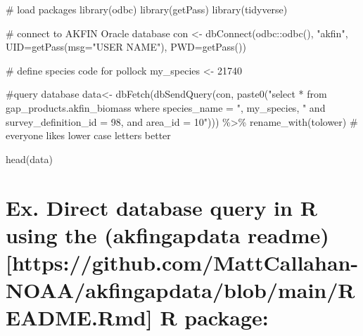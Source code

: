 \documentclass[
  letterpaper,
  oneside,
  open=any]{scrbook}
\newenvironment{Shaded}{\begin{snugshade}}{\end{snugshade}}
\newcommand{\AttributeTok}[1]{\textcolor[rgb]{0.40,0.45,0.13}{#1}}
\newcommand{\CommentTok}[1]{\textcolor[rgb]{0.37,0.37,0.37}{#1}}
\newcommand{\DecValTok}[1]{\textcolor[rgb]{0.68,0.00,0.00}{#1}}
\newcommand{\FunctionTok}[1]{\textcolor[rgb]{0.28,0.35,0.67}{#1}}
\newcommand{\NormalTok}[1]{\textcolor[rgb]{0.00,0.23,0.31}{#1}}
\newcommand{\OtherTok}[1]{\textcolor[rgb]{0.00,0.23,0.31}{#1}}
\newcommand{\SpecialCharTok}[1]{\textcolor[rgb]{0.37,0.37,0.37}{#1}}
\newcommand{\StringTok}[1]{\textcolor[rgb]{0.13,0.47,0.30}{#1}}
\begin{document}
\begin{Shaded}
\begin{Highlighting}[]
\CommentTok{\# load packages}
\FunctionTok{library}\NormalTok{(odbc)}
\FunctionTok{library}\NormalTok{(getPass)}
\FunctionTok{library}\NormalTok{(tidyverse)}

\CommentTok{\# connect to AKFIN Oracle database}
\NormalTok{con }\OtherTok{\textless{}{-}} \FunctionTok{dbConnect}\NormalTok{(odbc}\SpecialCharTok{::}\FunctionTok{odbc}\NormalTok{(), }\StringTok{"akfin"}\NormalTok{, }\AttributeTok{UID=}\FunctionTok{getPass}\NormalTok{(}\AttributeTok{msg=}\StringTok{"USER NAME"}\NormalTok{), }\AttributeTok{PWD=}\FunctionTok{getPass}\NormalTok{())}
\end{Highlighting}
\end{Shaded}

\begin{Shaded}
\begin{Highlighting}[]
\CommentTok{\# define species code for pollock}
\NormalTok{my\_species }\OtherTok{\textless{}{-}} \DecValTok{21740}

\CommentTok{\#query database}
\NormalTok{data}\OtherTok{\textless{}{-}} \FunctionTok{dbFetch}\NormalTok{(}\FunctionTok{dbSendQuery}\NormalTok{(con,}
                           \FunctionTok{paste0}\NormalTok{(}\StringTok{"select * from gap\_products.akfin\_biomass }
\StringTok{where species\_name = "}\NormalTok{, my\_species, }
\StringTok{" and survey\_definition\_id = 98, }
\StringTok{and area\_id = 10"}\NormalTok{))) }\SpecialCharTok{\%\textgreater{}\%}
\FunctionTok{rename\_with}\NormalTok{(tolower) }\CommentTok{\# everyone likes lower case letters better}

\FunctionTok{head}\NormalTok{(data)}
\end{Highlighting}
\end{Shaded}

\hypertarget{ex.-direct-database-query-in-r-using-the-akfingapdata-readmehttpsgithub.commattcallahan-noaaakfingapdatablobmainreadme.rmd-r-package-1}{%
\section{Ex. Direct database query in R using the (akfingapdata
readme){[}https://github.com/MattCallahan-NOAA/akfingapdata/blob/main/README.Rmd{]}
R
package:}\label{ex.-direct-database-query-in-r-using-the-akfingapdata-readmehttpsgithub.commattcallahan-noaaakfingapdatablobmainreadme.rmd-r-package-1}}
\end{document}
